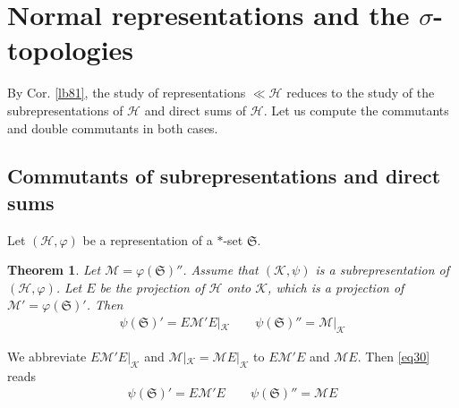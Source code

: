 \documentclass[12pt,b5paper,notitlepage]{article}
\theoremstyle{definition}
\theoremstyle{plain}
\newtheorem{thm}[df]{Theorem}
\newcommand{\fk}{\mathfrak}
\newcommand{\mc}{\mathcal}
\numberwithin{equation}{section}
\begin{document}
\section{Normal representations and the $\sigma$-topologies}


By Cor. \ref{lb81}, the study of representations $\ll\mc H$ reduces to the study of the subrepresentations of $\mc H$ and direct sums of $\mc H$. Let us compute the commutants and double commutants in both cases. %


\subsection*{Commutants of subrepresentations and direct sums}


Let $(\mc H,\varphi)$ be a representation of a $*$-set $\fk S$.

\begin{thm}\label{lb79}
Let $\mc M=\varphi(\fk S)''$. Assume that $(\mc K,\psi)$ is a subrepresentation of $(\mc H,\varphi)$. Let $E$ be the projection of $\mc H$ onto $\mc K$, which is a projection of $\mc M'=\varphi(\fk S)'$. Then
\begin{align}\label{eq30}
\psi(\fk S)'=E\mc M'E|_{\mc K}\qquad \psi(\fk S)''=\mc M|_{\mc K}
\end{align}
\end{thm}
We abbreviate $E\mc M'E|_{\mc K}$ and $\mc M|_{\mc K}=\mc ME|_{\mc K}$ to $E\mc M'E$ and $\mc ME$. Then \eqref{eq30} reads
\begin{align*}
\psi(\fk S)'=E\mc M'E\qquad \psi(\fk S)''=\mc M E
\end{align*}
\end{document}
